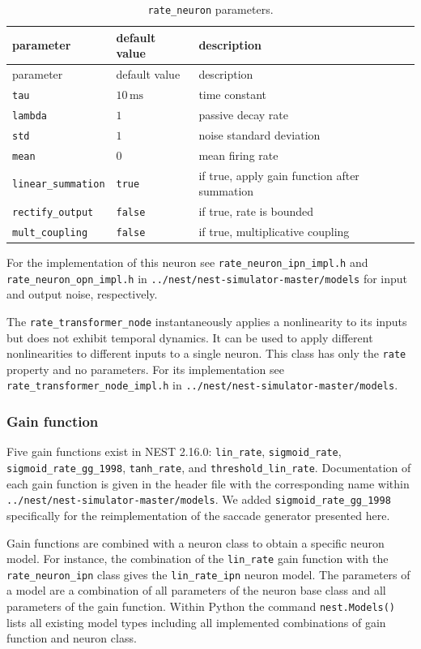 \documentclass[10pt,a4paper,onecolumn]{article}
\begin{document}
\begin{longtable}[c]{@{}lll@{}}
\caption{\texttt{rate\_neuron} parameters.
\label{tbl:table_2}}\tabularnewline
\toprule
parameter & default value & description\tabularnewline
\midrule
\endfirsthead
\toprule
parameter & default value & description\tabularnewline
\midrule
\endhead
\texttt{tau} & \(10\,\mathrm{ms}\) & time constant\tabularnewline
\texttt{lambda} & \(1\) & passive decay rate\tabularnewline
\texttt{std} & \(1\) & noise standard deviation\tabularnewline
\texttt{mean} & \(0\) & mean firing rate\tabularnewline
\texttt{linear\_summation} & \texttt{true} & if true, apply gain
function after summation\tabularnewline
\texttt{rectify\_output} & \texttt{false} & if true, rate is
bounded\tabularnewline
\texttt{mult\_coupling} & \texttt{false} & if true, multiplicative
coupling\tabularnewline
\bottomrule
\end{longtable}

For the implementation of this neuron see
\texttt{rate\_neuron\_ipn\_impl.h} and\\
\texttt{rate\_neuron\_opn\_impl.h} in
\texttt{../nest/nest-simulator-master/models} for input and output
noise, respectively.

The \texttt{rate\_transformer\_node} instantaneously applies a
nonlinearity to its inputs but does not exhibit temporal dynamics. It
can be used to apply different nonlinearities to different inputs to a
single neuron. This class has only the \texttt{rate} property and no
parameters. For its implementation see
\texttt{rate\_transformer\_node\_impl.h} in
\texttt{../nest/nest-simulator-master/models}.

\subsubsection{Gain function}\label{gain-function}

Five gain functions exist in NEST 2.16.0: \texttt{lin\_rate},
\texttt{sigmoid\_rate},\\
\texttt{sigmoid\_rate\_gg\_1998}, \texttt{tanh\_rate}, and
\texttt{threshold\_lin\_rate}. Documentation of each gain function is
given in the header file with the corresponding name within
\texttt{../nest/nest-simulator-master/models}. We added
\texttt{sigmoid\_rate\_gg\_1998} specifically for the reimplementation
of the saccade generator presented here.

Gain functions are combined with a neuron class to obtain a specific
neuron model. For instance, the combination of the \texttt{lin\_rate}
gain function with the \texttt{rate\_neuron\_ipn} class gives the
\texttt{lin\_rate\_ipn} neuron model. The parameters of a model are a
combination of all parameters of the neuron base class and all
parameters of the gain function. Within Python the command
\texttt{nest.Models()} lists all existing model types including all
implemented combinations of gain function and neuron class.

{\sffamily \small
  \printbibliography[title=References]
}
\end{document}
